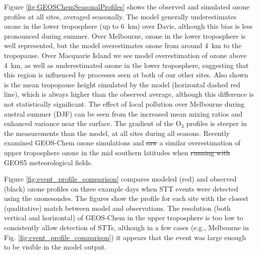 \documentclass[acp, manuscript]{copernicus} %
\providecommand{\DIFadd}[1]{{\protect\color{blue}\uwave{#1}}} %
\providecommand{\DIFdel}[1]{{\protect\color{red}\sout{#1}}}                      %
\providecommand{\DIFaddbegin}{} %
\providecommand{\DIFaddend}{} %
\providecommand{\DIFdelbegin}{} %
\providecommand{\DIFdelend}{} %
\begin{document}
  Figure \ref{fig:GEOSChemSeasonalProfiles} shows the observed and simulated ozone profiles at all sites, averaged seasonally.
  The model generally underestimates ozone in the lower troposphere (up to 6~km) over Davis, although this bias is less pronounced during summer.
  Over Melbourne, ozone in the lower troposphere is well represented, but the model overestimates ozone from around 4~km to the tropopause.
  Over Macquarie Island we see model overestimation of ozone above 4~km, as well as underestimated ozone in the lower troposphere, suggesting that this region is influenced by processes seen at both of our other sites.
  Also shown is the mean tropopause height simulated by the model (horizontal dashed red line), which is always higher than the observed average, although this difference is not statistically significant.
  The effect of local pollution over Melbourne during austral summer (DJF) can be seen from the increased mean mixing ratios and enhanced variance near the surface.
  The gradient of the O$_3$ profiles is steeper in the measurements than the model, at all sites during all seasons.
  Recently \cite{Hu2017} examined GEOS-Chem ozone simulations and \DIFdelbegin \DIFdel{saw }\DIFdelend \DIFaddbegin \DIFadd{found }\DIFaddend a similar overestimation of upper troposphere ozone in the mid southern latitudes when \DIFdelbegin \DIFdel{running with }\DIFdelend \DIFaddbegin \DIFadd{using the }\DIFaddend GEOS5 meteorological fields.

  Figure \ref{fig:event_profile_comparison} compares modeled (red) and observed (black) ozone profiles on three example days when STT events were detected using the ozonesondes. 
  The figures show the profile for each site with the closest (qualitative) match between model and observations.
  The resolution (both vertical and horizontal) of GEOS-Chem in the upper troposphere is too low to consistently allow detection of STTs, although in a few cases (e.g., Melbourne in Fig. \ref{fig:event_profile_comparison}) it appears that the event was large enough to be visible in the model output.
\end{document}

